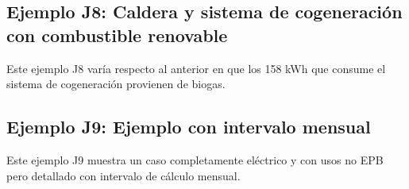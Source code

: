 \documentclass[10pt,notitlepage,oneside,a4paper]{article}
\begin{document}


\subsection{Ejemplo J8: Caldera y sistema de cogeneración con combustible renovable}
Este ejemplo J8 varía respecto al anterior en que los 158 kWh que consume el sistema de cogeneración provienen de biogas.





\subsection{Ejemplo J9: Ejemplo con intervalo mensual}
Este ejemplo J9 muestra un caso completamente eléctrico y con usos no EPB pero detallado con intervalo de cálculo mensual.




\end{document}
